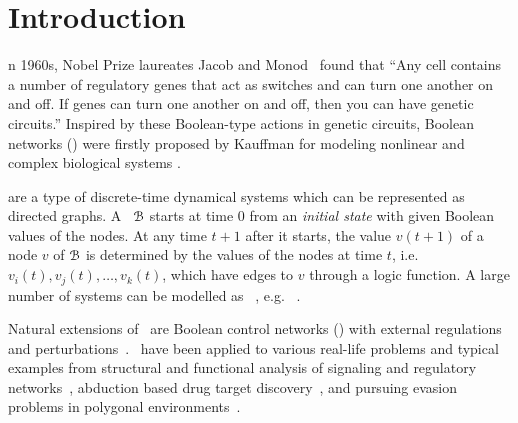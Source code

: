

\section{Introduction}
\label{sec:intro}


n 1960s, Nobel Prize laureates Jacob and Monod~\cite{Jacob1961Genetic} found that ``Any cell contains a number of regulatory genes that act as switches and can turn one another on and off. If genes can turn one another on and off, then you can have genetic circuits.'' Inspired by these Boolean-type actions in genetic circuits, Boolean networks (\BNs) were firstly proposed by Kauffman for modeling nonlinear and complex biological systems \cite{Kauffman1968Metabolic}. 

{\BNs} are a type of discrete-time dynamical systems which can be represented as directed graphs. A \BN\ ${\mathcal{B}}$ starts at time $0$ from an {\em initial state} with given Boolean values of the nodes. At any time $t+1$ after it starts, the value $v(t+1)$ of a node $v$ of ${\mathcal{B}}$ is determined by the values of the nodes at time $t$, i.e. $v_{i}(t),v_{j}(t),\ldots,v_k(t)$, which have edges to $v$ through a logic function. A large number of systems can be modelled as \BNs ~\cite{Kauffman1968Metabolic}, e.g. ~\cite{Akutsu2000Inferring, Shmulevich2002From, Faur2006Dynamical,Green2007The,Lou2010Multi}.


Natural extensions of \BNs\ are Boolean control networks (\BCNs) with external regulations and perturbations~\cite{Ideker2001A}. \BCNs\ have been applied to  various real-life problems %
and typical examples from  structural and functional analysis of signaling and regulatory networks~\cite{Kaufman1999A, Klamt2006A}, 
abduction based drug target discovery~\cite{Biane2017Abduction}, 
and pursuing evasion problems in polygonal environments~\cite{Thunberg2011A}.
%

